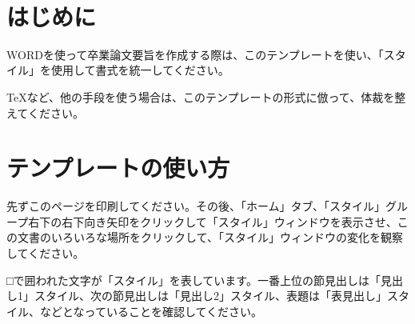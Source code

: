 \documentclass[9pt,twocolumn]{jarticle}
\begin{document}
%

\vspace{-1.4em}
\section{はじめに}
WORDを使って卒業論文要旨を作成する際は、このテンプレートを使い、「スタイル」を使用して書式を統一してください。

TeXなど、他の手段を使う場合は、このテンプレートの形式に倣って、体裁を整えてください。
\section{テンプレートの使い方}
先ずこのページを印刷してください。その後、「ホーム」タブ、「スタイル」グループ右下の右下向き矢印をクリックして「スタイル」ウィンドウを表示させ、この文書のいろいろな場所をクリックして、「スタイル」ウィンドウの変化を観察してください。

□で囲われた文字が「スタイル」を表しています。一番上位の節見出しは「見出し1」スタイル、次の節見出しは「見出し2」スタイル、表題は「表見出し」スタイル、などとなっていることを確認してください。
\end{document}
